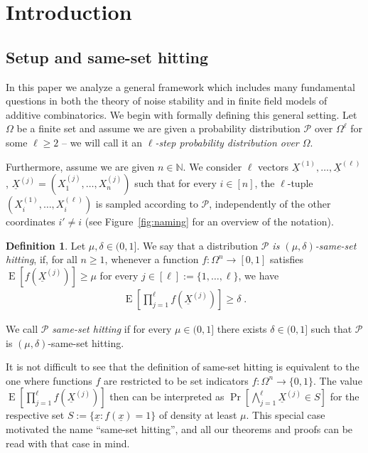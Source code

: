 \documentclass{daj}
\newcommand{\1}{\mathbbm{1}}
\theoremstyle{plain}
\theoremstyle{definition}
\newtheorem{definition}[theorem]{Definition}
\DeclareMathOperator*{\EE}{E}
\newcommand{\bbN}{\mathbb{N}}
\begin{document}
\section{Introduction}

\subsection{Setup and same-set hitting} 
In this paper we analyze a general framework which includes many fundamental
questions in both
the theory of noise stability and in finite field models of additive combinatorics. 
We begin with formally defining this general setting. 
Let $\Omega$ be a finite set  
and assume we are given a probability distribution $\mathcal{P}$
over $\Omega^\ell$
for some $\ell \ge 2$ -- we will call it an
\emph{$\ell$-step probability distribution over $\Omega$}.

Furthermore, assume we are given $n \in \bbN$.
We consider $\ell$ vectors $\underline{X}^{(1)}, \allowbreak \ldots, 
\allowbreak \underline{X}^{(\ell)}$,
$\underline{X}^{(j)} = (X_1^{(j)},\allowbreak \ldots, X_n^{(j)})$ such that 
for every $i \in [n]$, the $\ell$-tuple $(X_i^{(1)}, \ldots, \allowbreak  X_i^{(\ell)})$ 
is sampled according to $\mathcal{P}$, independently of the other
coordinates $i' \neq i$
(see Figure~\ref{fig:naming} for an overview of the notation). 

\begin{definition}
\label{def:same-hitting}
Let $\mu, \delta \in (0, 1]$. We say that a distribution
\emph{$\mathcal{P}$ is $(\mu, \delta)$-same-set hitting},
if, for all $n \geq 1$, whenever a function $f: \Omega^n \to [0, 1]$ satisfies
$\EE[f(\underline{X}^{(j)})] \ge \mu$
for every $j \in [\ell] := \{1, \ldots, \ell\}$,
we have
\begin{align*}
\EE \left[ \prod_{j=1}^\ell f(\underline{X}^{(j)})\right]
  \ge \delta \; .
\end{align*}

We call $\mathcal{P}$ \emph{same-set hitting} if for every 
$\mu \in (0, 1]$ there exists $\delta \in (0, 1]$ such that
$\mathcal{P}$ is $(\mu, \delta)$-same-set hitting.
\end{definition}

It is not difficult to see that the definition
of same-set hitting is equivalent to the one where functions $f$
are restricted to be set indicators $f: \Omega^n \to \{0,1\}$.
The value $\EE\left[\prod_{j=1}^\ell f\left(\underline{X}^{(j)}\right)\right]$
then can be interpreted as 
$\Pr\left[\bigwedge_{j=1}^\ell \underline{X}^{(j)} \in S\right]$
for the respective set $S := \{\underline{x}: f(\underline{x})=1\}$ of density
at least $\mu$. This special case motivated the name ``same-set hitting'',
and all our theorems and proofs can be read with that case
in mind.
\end{document}
